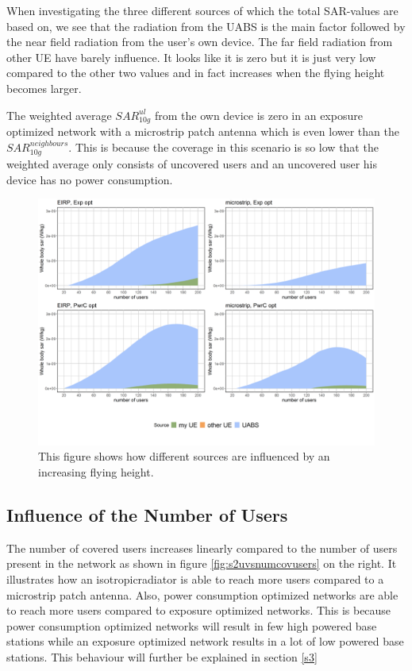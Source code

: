 When investigating the three different sources of which the total \gls{SAR}-values are based on, we see 
that the radiation from the \gls{UABS} is the main factor followed by the near field radiation from the user's own device.
The far field radiation from other \gls{UE} have barely influence. 
It looks like it is zero but it is just very low compared to the other two values and in fact increases when the flying height becomes larger.

The weighted average $SAR^{ul}_{10g}$ from the own device is zero in an exposure optimized network with a microstrip patch antenna which is even lower than the $SAR^{neighbours}_{10g}$.
This is because the coverage in this scenario is so low that the weighted average only consists of uncovered users and an uncovered user his device has no power consumption.
\begin{figure}[]
  \includegraphics[width=\textwidth]{../results/s2/fhFourSources.png}
  \caption{This figure shows how different sources are influenced by an increasing flying height.}
  \label{fig:s2shfourSourcesMatrix}
\end{figure}

\FloatBarrier
\subsection{Influence of the Number of Users}
\label{s2b}

The number of covered users increases linearly compared to the number of users present in the network as shown in figure 
\ref{fig:s2uvsnumcovusers} on the right. It illustrates how an \gls{isotropicradiator} is able to reach more users 
compared to a microstrip patch antenna. Also, power consumption optimized networks are able to reach more users compared to exposure optimized networks.
This is because power consumption optimized networks will result in few high powered base stations while an 
exposure optimized network results in a lot of low powered base stations. This behaviour will further be explained in section \ref{s3}


